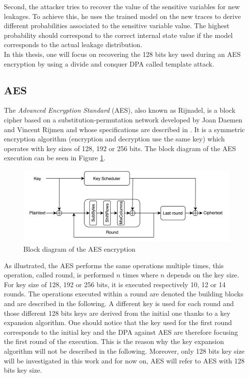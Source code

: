 Second, the attacker tries to recover the value of the sensitive variables 
for new leakages. To achieve this, he uses the trained model on the new 
traces to derive different probabilities associated to the sensitive 
variable value. The highest probability should correspond to the correct 
internal state value if the model corresponds to the actual leakage 
distribution.\\

In this thesis, one will focus on recovering the 128 bits key used during 
an AES encryption by using a divide and conquer DPA called template 
attack.
\subsection{AES}\label{sect:AES}
The \textit{Advanced Encryption Standard} (AES), also known as Rijnadel, 
is a block cipher based on a substitution-permutation network developed by 
Joan Daemen and Vincent Rijmen and whose specifications are described in 
\cite{AES_spec}. It is a symmetric encryption algorithm (encryption and 
decryption use the same key) which operates with key sizes of 128, 192 or 
256 bits. The block diagram of the AES execution can be seen in Figure 
\ref{fig:aes building block}. 
\begin{figure}[h]
    \centering
    \includegraphics[scale=0.7]{Images/AES schematic.png}
    \caption{Block diagram of the AES encryption}
    \label{fig:aes building block}
\end{figure}
As illustrated, the AES performs the same operations multiple times, this 
operation, called round, is performed $n$ times where $n$ depends on the 
key size. For key size of 128, 192 or 256 bits, it is executed 
respectively 10, 12 or 14 rounds. The operations executed within a round 
are denoted the building blocks and are described in the following. A 
different key is used for each round and those different 128 bits keys are 
derived from the initial one thanks to a key expansion algorithm. One 
should notice that the key used for the first round corresponds to the 
initial key and the DPA against AES are therefore focusing the first round 
of the execution. This is the reason why the key expansion algorithm will 
not be described in the following. Moreover, only 128 bits key size will 
be investigated in this work and for now on, AES will refer to AES with 
128 bits key size.


